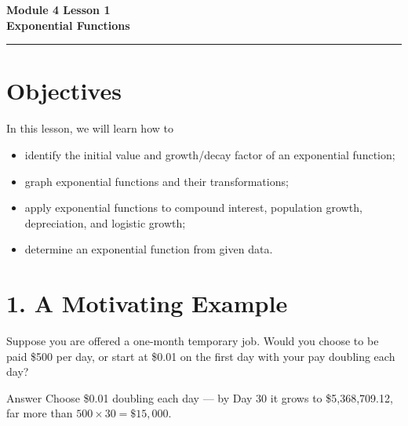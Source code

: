 \documentclass[12pt]{article}
\begin{document}
\handwriting

\begin{center}
    \Large\textbf{\color{primaryblue}Module 4 Lesson 1\\Exponential Functions} \\
    \vspace{0.2cm}
    \hrule
\end{center}

\section*{Objectives}

\begin{friendlyrule}{In this lesson, we will learn how to}
\begin{itemize}
    \item identify the initial value and growth/decay factor of an exponential function;
    \item graph exponential functions and their transformations;
    \item apply exponential functions to compound interest, population growth, depreciation, and logistic growth;
    \item determine an exponential function from given data.
\end{itemize}
\end{friendlyrule}

\section*{1. A Motivating Example}

Suppose you are offered a one-month temporary job. Would you choose to be paid \$500 per day, or start at \$0.01 on the first day with your pay doubling each day?

\begin{friendlyrule}{Answer}
Choose \$0.01 doubling each day --- by Day 30 it grows to \$5{,}368{,}709.12, far more than $500\times30=\$15{,}000$.
\end{friendlyrule}
\end{document}
